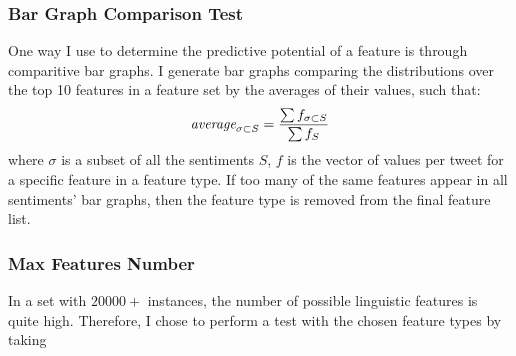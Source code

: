 \documentclass[11pt]{article}
\begin{document}
\subsubsection{Bar Graph Comparison Test}\label{sec:bargraphs}

One way I use to determine the predictive potential of a feature is through comparitive bar graphs.
I generate bar graphs comparing the distributions over the top 10 features in a feature set by the averages of their values, such that:
\begin{equation*}
	\emph{average}_{\sigma \subset S} = \frac{\sum f_{\sigma \subset S}}{\sum f_S}
\end{equation*}
where $\sigma$ is a subset of all the sentiments $S$, $f$ is the vector of values per tweet for a specific feature in a feature type.
If too many of the same features appear in all sentiments' bar graphs, then the feature type is removed from the final feature list.

\subsubsection{Max Features Number}

In a set with $20000+$ instances, the number of possible linguistic features is quite high.
Therefore, I chose to perform a test with the chosen feature types by taking 




\end{document}
